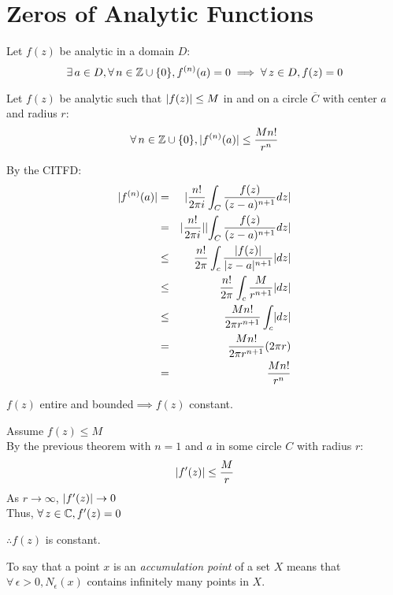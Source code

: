 \documentclass[letterpaper,12pt,fleqn]{article}
\newcommand{\e}{\epsilon}
\begin{document}
\section*{Zeros of Analytic Functions}

\begin{theorem}
  Let $f(z)$ be analytic in a domain $D$:
  \[\exists\,a\in D,\forall\,n\in\mathbb{Z}\cup\{0\},f^{(n)}(a)=0\implies
  \forall\,z\in D,f(z)=0\]
\end{theorem}

\begin{theorem}
  Let $f(z)$ be analytic such that $\lvert f(z)\rvert\le M$ in and on a circle
  $\overline{C}$ with center $a$ and radius $r$:
  \[\forall\,n\in\mathbb{Z}\cup\{0\},\lvert f^{(n)}(a)\rvert\le\frac{Mn!}{r^n}\]
\end{theorem}

\begin{theproof}
  By the CITFD:
  \begin{eqnarray*}
    \lvert f^{(n)}(a)\rvert &=& \lvert\frac{n!}{2\pi i}\int_C\frac{f(z)}
      {(z-a)^{n+1}}dz\rvert \\
    &=& \lvert\frac{n!}{2\pi i}\rvert\lvert\int_C\frac{f(z)}{(z-a)^{n+1}}dz\rvert \\
    &\le& \frac{n!}{2\pi}\int_c\frac{\lvert f(z)\rvert}{\lvert z-a\rvert^{n+1}}\lvert dz\rvert \\
    &\le& \frac{n!}{2\pi}\int_c\frac{M}{r^{n+1}}\lvert dz\rvert \\
    &\le& \frac{Mn!}{2\pi r^{n+1}}\int_c\lvert dz\rvert \\
    &=& \frac{Mn!}{2\pi r^{n+1}}(2\pi r) \\
    &=& \frac{Mn!}{r^n}
  \end{eqnarray*}
\end{theproof}

\begin{theorem}[Liouville]
  $f(z)$ entire and bounded$\implies f(z)$ constant.
\end{theorem}

\begin{theproof}
  Assume $f(z)\le M$ \\
  By the previous theorem with $n=1$ and $a$ in some circle $C$ with radius
  $r$:
  \[\lvert f'(z)\rvert\le\frac{M}{r}\]
  As $r\to\infty$, $\lvert f'(z)\rvert\to0$ \\
  Thus, $\forall\,z\in\mathbb{C},f'(z)=0$
  
  $\therefore f(z)$ is constant.
\end{theproof}

\begin{definition}
  To say that a point $x$ is an \emph{accumulation point} of a set $X$ means
  that $\forall\,\e>0,N_{\e}(x)$ contains infinitely many points in $X$.
\end{definition}
\end{document}
